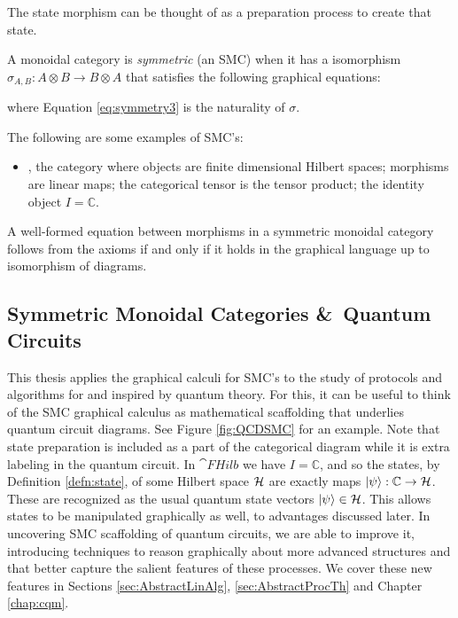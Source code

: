 \noindent The state morphism can be thought of as a preparation process to create that state.

\begin{defn}
A monoidal category is \emph{symmetric} (an SMC) when it has a isomorphism
$\sigma_{A,B}:A\otimes B\to B\otimes A$ that satisfies the following graphical equations:
\begin{equation}
\label{eq:symmetry}

\end{equation}
\begin{equation}
\label{eq:symmetry2}

\end{equation}
\begin{equation}
\label{eq:symmetry3}

\end{equation}
\end{defn}
\noindent where Equation \ref{eq:symmetry3} is the naturality of $\sigma$.

\begin{examples}
The following are some examples of SMC's:
\begin{itemize}
\item {}, the category where objects are finite dimensional Hilbert spaces; morphisms are linear maps; the categorical tensor is the tensor product; the identity object $I=\mathbb{C}$.
\end{itemize}
\end{examples}

\begin{theorem}{\cite[Thm 2.3]{joyal1991geometry}}
A well-formed equation between morphisms in a symmetric monoidal category follows from the axioms if and only if it holds in the graphical language up to isomorphism of diagrams.
\end{theorem}

\subsection{Symmetric Monoidal Categories \&\ Quantum Circuits}
This thesis applies the graphical calculi for SMC's to the study of protocols and algorithms for and inspired by quantum theory. For this, it can be useful to think of the SMC graphical calculus as mathematical scaffolding that underlies quantum circuit diagrams. See Figure \ref{fig:QCDSMC} for an example. Note that state preparation is included as a part of the categorical diagram while it is extra labeling in the quantum circuit. In $\cat{FHilb}$ we have $I=\mathbb{C}$, and so the states, by Definition \ref{defn:state}, of some Hilbert space $\mathcal{H}$ are exactly maps $| \psi \rangle:\mathbb{C}\to\mathcal{H}$. These are recognized as the usual quantum state vectors $| \psi \rangle\in\mathcal{H}$. This allows states to be manipulated graphically as well, to advantages discussed later. In uncovering SMC scaffolding of quantum circuits, we are able to improve it, introducing techniques to reason graphically about more advanced structures and that better capture the salient features of these processes. We cover these new features in Sections \ref{sec:AbstractLinAlg}, \ref{sec:AbstractProcTh} and Chapter \ref{chap:cqm}.

